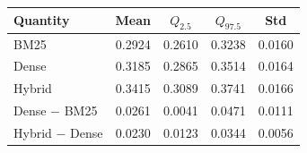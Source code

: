 \begin{tabular}{lSSSS}
\toprule
\textbf{Quantity} & \textbf{Mean} & \textbf{$Q_{2.5}$} & \textbf{$Q_{97.5}$} & \textbf{Std} \\
\midrule
BM25 & 0.2924 & 0.2610 & 0.3238 & 0.0160 \\
Dense & 0.3185 & 0.2865 & 0.3514 & 0.0164 \\
Hybrid & 0.3415 & 0.3089 & 0.3741 & 0.0166 \\
\midrule
Dense $-$ BM25 & 0.0261 & 0.0041 & 0.0471 & 0.0111 \\
Hybrid $-$ Dense & 0.0230 & 0.0123 & 0.0344 & 0.0056 \\
\bottomrule
\end{tabular}
